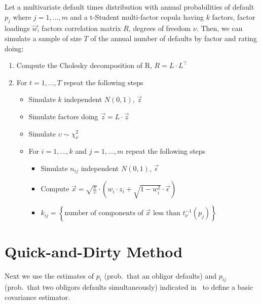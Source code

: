 \documentclass[11pt,fleqn]{book} %
\begin{document}
\begin{algorithm}
	\label{alg:snod}
	Let a multivariate default times distribution with annual probabilities of
	default $p_j$ where $j=1,\dots,m$ and a t-Student multi-factor copula having
	$k$ factors, factor loadings $\vec{w}$, factors correlation matrix $R$, 
	degrees of freedom $\nu$. Then, we can simulate a sample of size $T$ of the 
	annual number of defaults by factor and rating doing:
	\begin{enumerate}
		\item Compute the Cholesky decomposition of R, $R = L \cdot L^\intercal$
		\item For $t=1,\dots,T$ repeat the following steps
		\begin{itemize}
			\item Simulate $k$ independent $N(0,1)$, $\vec{z}$
			\item Simulate factors doing $\vec{z} = L \cdot \vec{z}$
			\item Simulate $\upsilon \sim \chi_{\nu}^2$
			\item For $i=1,\dots,k$ and $j=1,\dots,m$ repeat the following steps
			\begin{itemize}
				\item Simulate $n_{ij}$ independent $N(0,1)$, $\vec{\epsilon}$
				\item Compute $\vec{x} = \sqrt{\frac{\nu}{\upsilon}} \cdot \left( w_i \cdot z_i + \sqrt{1-w_i^2} \cdot \vec{\epsilon} \right)$
				\item $k_{ij} = \left\{ \text{number of components of $\vec{x}$ less than $t_{\nu}^{-1}(p_j)$} \right\} $
			\end{itemize}
		\end{itemize}
	\end{enumerate}
\end{algorithm}

\section{Quick-and-Dirty Method}

Next we use the estimates of $p_i$ (prob.\ that an obligor defaults)
and $p_{ij}$ (prob.\ that two obligors defaults simultaneously) indicated 
in~\cite{nagpal:2001} to define a basic covariance estimator. 
\end{document}
